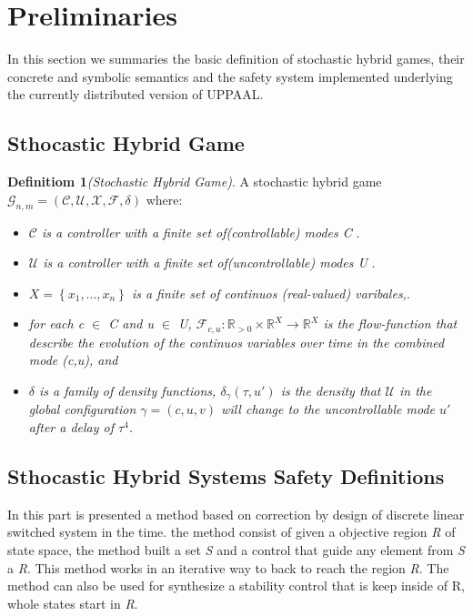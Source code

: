 \documentclass[conference]{IEEEtran}
\begin{document}
\section{Preliminaries}

In this section we summaries the basic definition of stochastic hybrid games, 
their concrete and symbolic semantics and the safety system implemented 
underlying the currently distributed version of UPPAAL.\cite{larsen2016online}


\subsection{Sthocastic Hybrid Game}

\textbf{Definitiom 1}\emph{(Stochastic Hybrid Game)}. A stochastic hybrid
game $\mathcal{G}_{n,m} = (\mathcal{C,U,X,F},\delta)$ where:



\begin{itemize}
    \item \emph{$\mathcal{C}$ is a controller with a finite set of(controllable) modes C }.
    \item \emph{$\mathcal{U}$ is a controller with a finite set of(uncontrollable) modes U }.
    \item \emph{$X = \left\{ x_{1},...,x_{n}  \right\}$ is a finite set of continuos (real-valued) varibales,}.
    \item \emph{ for each c $\in$ C and u $\in$ U,  $\mathcal{F}_{c,u} : \mathbb{R}_{>0} \times
     \mathbb{R}^{X} \rightarrow  \mathbb{R}^{X}$ is the flow-function that describe the 
     evolution of the continuos variables over time in the combined mode (c,u), and  }
    \item \emph{ $\delta$ is a family of density functions, $\delta_\gamma(\tau,u') $ is the
    density that $\mathcal{U}$ in the global configuration $\gamma = (c,u,v)$ will change to 
    the uncontrollable mode $u'$ after a delay of $\tau^{4}$.  }
    
\end{itemize}







\subsection{Sthocastic Hybrid Systems Safety Definitions}



In this part is presented a method based on correction by design of
 discrete linear switched system in the time. the method consist of 
 given a objective region \emph{R} of state space, the method built 
 a set \emph{S} and a control that guide any element from  \emph{S} 
 a \emph{R}. This method works in an iterative way to back to reach 
 the region \emph{R}. The method  can also be used for synthesize 
 a stability control that is keep inside of R, whole states start in
  \emph{R}.
\end{document}
